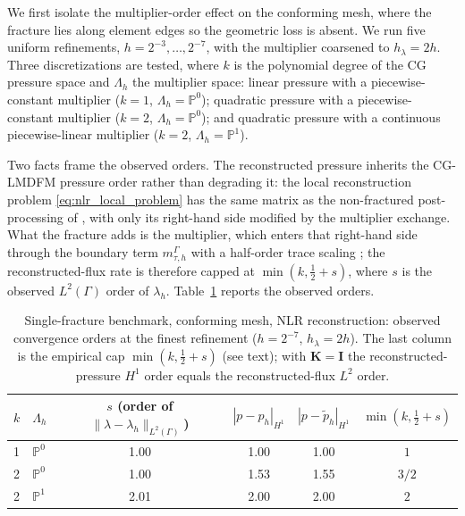 \documentclass[a4paper,fleqn]{cas-sc}
\newcommand{\Kmat}{\mathbf{K}}
\begin{document}
We first isolate the multiplier-order effect on the conforming mesh, where the
fracture lies along element edges so the geometric loss is absent. We run five uniform
refinements, \(h=2^{-3},\ldots,2^{-7}\), with the multiplier coarsened to
\(h_\lambda=2h\). Three discretizations are tested, where \(k\) is the polynomial
degree of the CG pressure space and \(\Lambda_h\) the multiplier space: linear
pressure with a piecewise-constant multiplier (\(k=1\), \(\Lambda_h=\mathbb{P}^0\));
quadratic pressure with a piecewise-constant multiplier (\(k=2\),
\(\Lambda_h=\mathbb{P}^0\)); and quadratic pressure with a continuous
piecewise-linear multiplier (\(k=2\), \(\Lambda_h=\mathbb{P}^1\)).

Two facts frame the observed orders. The reconstructed pressure inherits the
CG-LMDFM pressure order rather than degrading it: the local reconstruction problem
\eqref{eq:nlr_local_problem} has the same matrix as the non-fractured
post-processing of \citet{DENG2019166}, with only its right-hand side modified by
the multiplier exchange. What the fracture adds is the multiplier, which enters
that right-hand side through the boundary term \(m_{\tau,h}^\Gamma\) with a
half-order trace scaling \citep{Koeppel2019,DENG2019166}; the reconstructed-flux
rate is therefore capped at \(\min(k,\tfrac12+s)\), where \(s\) is the observed
\(L^2(\Gamma)\) order of \(\lambda_h\). Table~\ref{tab:single_fracture_reconstruction}
reports the observed orders.

\begin{table}[!htbp]
\centering
\caption{Single-fracture benchmark, conforming mesh, NLR reconstruction:
observed convergence orders at the finest refinement (\(h=2^{-7}\),
\(h_\lambda=2h\)). The last column is the empirical cap \(\min(k,\tfrac12+s)\)
(see text); with \(\Kmat=\mathbf{I}\) the reconstructed-pressure \(H^1\) order
equals the reconstructed-flux \(L^2\) order.}
\label{tab:single_fracture_reconstruction}
\begin{tabular}{llcccc}
\toprule
\(k\) & \(\Lambda_h\) &
\(s\) (order of \(\|\lambda-\lambda_h\|_{L^2(\Gamma)}\)) &
\(|p-p_h|_{H^1}\) &
\(|p-\widetilde p_h|_{H^1}\) &
\(\min(k,\tfrac12{+}s)\)\\
\midrule
1 & \(\mathbb{P}^0\) & 1.00 & 1.00 & 1.00 & \(1\)\\
2 & \(\mathbb{P}^0\) & 1.00 & 1.53 & 1.55 & \(3/2\)\\
2 & \(\mathbb{P}^1\) & 2.01 & 2.00 & 2.00 & \(2\)\\
\bottomrule
\end{tabular}
\end{table}
\end{document}
